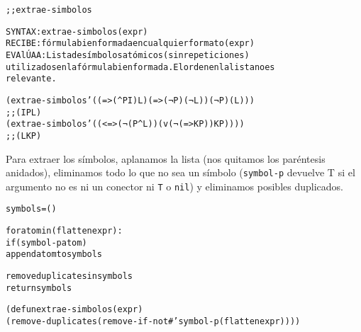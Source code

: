 \begin{aibox}{\function}
\begin{alltt}
;; extrae-simbolos

SYNTAX: extrae-simbolos (expr)
RECIBE : fórmula bien formada en cualquier formato (expr)
EVAlÚA A: Lista de símbolos atómicos (sin repeticiones)
	utilizados en la fórmula bien formada. El orden en la lista no es
	relevante.

\end{alltt}
\end{aibox}

\begin{aibox}{\examples}
\begin{alltt}
(extrae-simbolos '((=> (^ P I) L) (=> (¬ P) (¬ L)) (¬ P) (L)))
;; (I P L)
(extrae-simbolos '((<=> (¬ (P ^ L)) (v (¬ (=> K P)) K P))))
;; (L K P)
\end{alltt}

\end{aibox}

\begin{aibox}{\comments}
Para extraer los símbolos, aplanamos la lista (nos quitamos los paréntesis anidados), eliminamos todo lo que no sea un símbolo (\texttt{symbol-p} devuelve T si el argumento no es ni un conector ni \texttt{T} o \texttt{nil}) y eliminamos posibles duplicados.
\end{aibox}

\begin{aibox}{\pseudocode}
\begin{alltt}
symbols = ()

for atom in (flatten expr):
    if (symbol-p atom)
        append atom to symbols

remove duplicates in symbols
return symbols

\end{alltt}
\end{aibox}

\begin{aibox}{\code}

\begin{alltt}

(defun extrae-simbolos (expr)
    (remove-duplicates (remove-if-not #'symbol-p (flatten expr))))

\end{alltt}
\end{aibox}
